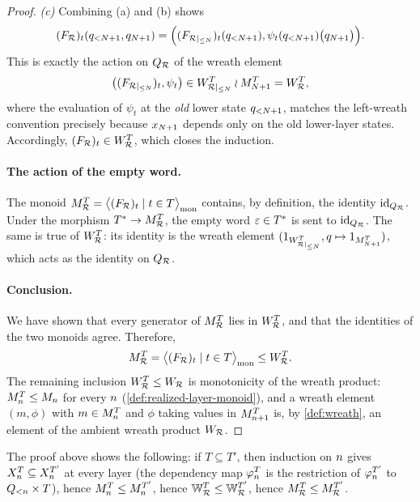 \documentclass{article}
\begin{document}
\begin{proof}
\smallskip
\emph{(c)} Combining (a) and (b) shows
$$
(F_{\mathcal{R}})_t(q_{<N+1}, q_{N+1}) = \Bigl( (F_{\mathcal{R}|_{\leq N}})_t(q_{<N+1}), \psi_t(q_{<N+1})\bigl(q_{N+1}\bigr)
\Bigr).
$$
This is exactly the action on $Q_{\mathcal{R}}$ of the wreath element
$$
\bigl((F_{\mathcal{R}|_{\leq N}})_t, \psi_t\bigr) \in W_{\mathcal{R}|_{\leq N}}^T \wr M_{N+1}^T = W_{\mathcal{R}}^T,
$$
where the evaluation of $\psi_t$ at the \emph{old} lower state $q_{<N+1}$, 
matches the left-wreath convention precisely because $x_{N+1}$ depends only on the old lower-layer states. 
Accordingly, $(F_{\mathcal{R}})_t \in W_{\mathcal{R}}^T$, which closes the induction.

\paragraph{The action of the empty word.}
The monoid $M_{\mathcal{R}}^T = \bigl\langle (F_{\mathcal{R}})_t \mid t \in T \bigr\rangle_{\mathrm{mon}}$ contains, by definition, the identity $\mathrm{id}_{Q_{\mathcal{R}}}$. 
Under the morphism $T^* \to M_{\mathcal{R}}^T$, the empty word $\varepsilon \in T^*$ is sent to $\mathrm{id}_{Q_{\mathcal{R}}}$. The same is true of $W_{\mathcal{R}}^T$: its identity is the wreath element $(1_{W_{\mathcal{R}|_{\leq N}}^T}, q \mapsto 1_{M_{N+1}^T})$, which acts as the identity on $Q_{\mathcal{R}}$. 

\paragraph{Conclusion.}
We have shown that every generator of $M_{\mathcal{R}}^T$ lies in $W_{\mathcal{R}}^T$, and that the identities of the two monoids agree. Therefore,
$$
M_{\mathcal{R}}^T = \bigl\langle (F_{\mathcal{R}})_t \mid t \in T \bigr\rangle_{\mathrm{mon}} \leq W_{\mathcal{R}}^T.
$$
The remaining inclusion $W_{\mathcal{R}}^T \leq W_{\mathcal{R}}$ is monotonicity of the wreath product: $M_n^T \leq M_n$ for every $n$ (\cref{def:realized-layer-monoid}), and a wreath element $(m, \phi)$ with $m \in M_n^T$ and $\phi$ taking values in $M_{n+1}^T$ is, by \cref{def:wreath}, an element of the ambient wreath product $W_{\mathcal{R}}$. 
\end{proof}

\begin{remark}\label{rem:functoriality-T}
The proof above shows the following: if $T \subseteq T'$, then induction on $n$ gives $X_n^T \subseteq X_n^{T'}$ at every layer (the dependency map $\varphi_n^T$ is the restriction of $\varphi_n^{T'}$ to $Q_{<n} \times T$), hence $M_n^T \leq M_n^{T'}$, hence $\mathbb{W}_{\mathcal{R}}^T \leq \mathbb{W}_{\mathcal{R}}^{T'}$, hence $M_{\mathcal{R}}^T \leq M_{\mathcal{R}}^{T'}$. \end{remark}
\end{document}
